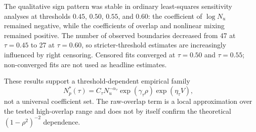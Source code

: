 The qualitative sign pattern was stable in ordinary least-squares sensitivity analyses at thresholds $0.45$, $0.50$, $0.55$, and $0.60$: the coefficient of $\log N_u$ remained negative, while the coefficients of overlap and nonlinear mixing remained positive. The number of observed boundaries decreased from 47 at $\tau=0.45$ to 27 at $\tau=0.60$, so stricter-threshold estimates are increasingly influenced by right censoring. Censored fits converged at $\tau=0.50$ and $\tau=0.55$; non-converged fits are not used as headline estimates.

These results support a threshold-dependent empirical family
\begin{equation}
  N_p^{\ast}(\tau)
  =C_{\tau}N_u^{-\alpha_{\tau}}
  \exp(\gamma_{\tau}\rho)
  \exp(\eta_{\tau}V),
\end{equation}
not a universal coefficient set. The raw-overlap term is a local approximation over the tested high-overlap range and does not by itself confirm the theoretical $(1-\rho^2)^{-2}$ dependence.
